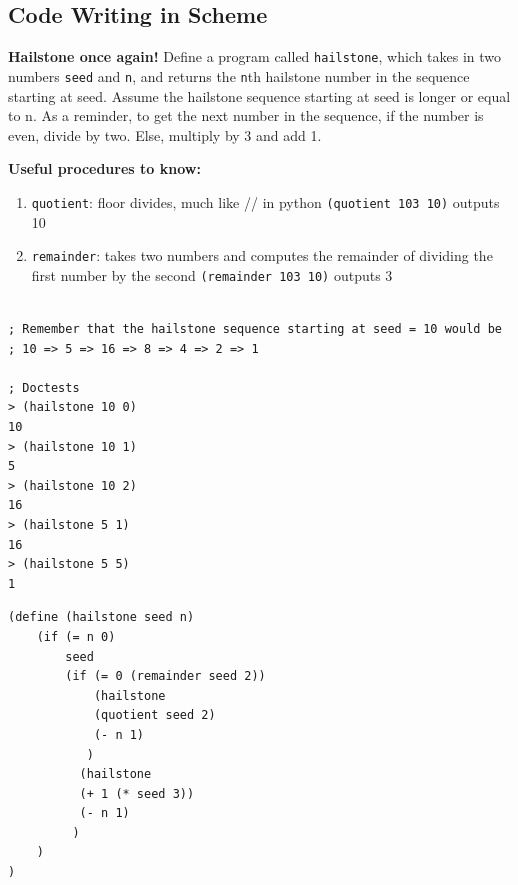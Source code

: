\documentclass{exam}
\begin{document}
\begin{questions}
\section{Code Writing in Scheme}

\begin{blocksection}
\question \textbf{Hailstone once again!} Define a program called \texttt{hailstone}, which takes in two numbers \texttt{seed} and \texttt{n}, and returns the \texttt{n}th hailstone number in the sequence starting at seed. Assume the hailstone sequence starting at seed is longer or equal to n. As a reminder, to get the next number in the sequence, if the number is even, divide by two. Else, multiply by 3 and add 1. \newline

\textbf{Useful procedures to know:} \newline
\begin{enumerate}
\item \texttt{quotient}: floor divides, much like // in python
\subitem \texttt{(quotient 103 10)} outputs 10
\item \texttt{remainder}: takes two numbers and computes the remainder of dividing the first number by the second
\subitem \texttt{(remainder 103 10)} outputs 3
\end{enumerate}

\begin{lstlisting}

; Remember that the hailstone sequence starting at seed = 10 would be
; 10 => 5 => 16 => 8 => 4 => 2 => 1

; Doctests
> (hailstone 10 0)
10
> (hailstone 10 1)
5
> (hailstone 10 2)
16
> (hailstone 5 1)
16
> (hailstone 5 5)
1
\end{lstlisting}

\begin{solution}[1in]
\begin{lstlisting}
(define (hailstone seed n)
    (if (= n 0)
        seed
        (if (= 0 (remainder seed 2))
            (hailstone
            (quotient seed 2)
            (- n 1)
           )
          (hailstone
          (+ 1 (* seed 3))
          (- n 1)
         )
    )
)
\end{lstlisting}
\end{solution}
\end{blocksection}


\end{questions}
\end{document}
